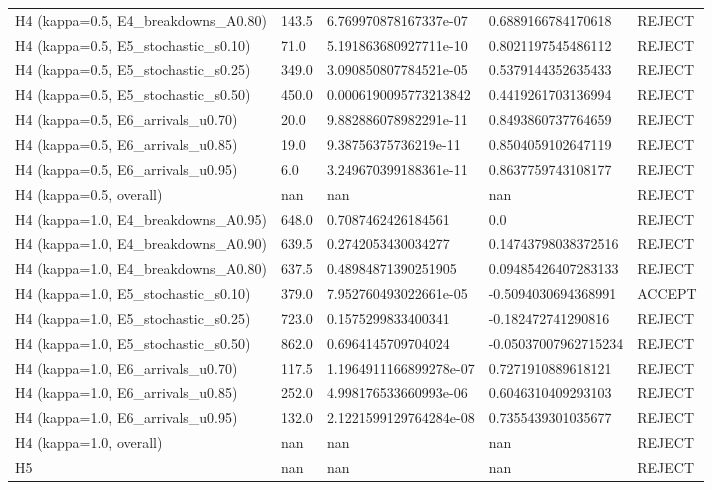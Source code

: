 \begin{table}[htbp]
\begin{tabular}{lllll}
H4 (kappa=0.5, E4\_breakdowns\_A0.80) & 143.5 & 6.769970878167337e-07 & 0.6889166784170618 & REJECT \\
H4 (kappa=0.5, E5\_stochastic\_s0.10) & 71.0 & 5.191863680927711e-10 & 0.8021197545486112 & REJECT \\
H4 (kappa=0.5, E5\_stochastic\_s0.25) & 349.0 & 3.090850807784521e-05 & 0.5379144352635433 & REJECT \\
H4 (kappa=0.5, E5\_stochastic\_s0.50) & 450.0 & 0.0006190095773213842 & 0.4419261703136994 & REJECT \\
H4 (kappa=0.5, E6\_arrivals\_u0.70) & 20.0 & 9.882886078982291e-11 & 0.8493860737764659 & REJECT \\
H4 (kappa=0.5, E6\_arrivals\_u0.85) & 19.0 & 9.38756375736219e-11 & 0.8504059102647119 & REJECT \\
H4 (kappa=0.5, E6\_arrivals\_u0.95) & 6.0 & 3.249670399188361e-11 & 0.8637759743108177 & REJECT \\
H4 (kappa=0.5, overall) & nan & nan & nan & REJECT \\
H4 (kappa=1.0, E4\_breakdowns\_A0.95) & 648.0 & 0.7087462426184561 & 0.0 & REJECT \\
H4 (kappa=1.0, E4\_breakdowns\_A0.90) & 639.5 & 0.2742053430034277 & 0.14743798038372516 & REJECT \\
H4 (kappa=1.0, E4\_breakdowns\_A0.80) & 637.5 & 0.48984871390251905 & 0.09485426407283133 & REJECT \\
H4 (kappa=1.0, E5\_stochastic\_s0.10) & 379.0 & 7.952760493022661e-05 & -0.5094030694368991 & ACCEPT \\
H4 (kappa=1.0, E5\_stochastic\_s0.25) & 723.0 & 0.1575299833400341 & -0.182472741290816 & REJECT \\
H4 (kappa=1.0, E5\_stochastic\_s0.50) & 862.0 & 0.6964145709704024 & -0.05037007962715234 & REJECT \\
H4 (kappa=1.0, E6\_arrivals\_u0.70) & 117.5 & 1.1964911166899278e-07 & 0.7271910889618121 & REJECT \\
H4 (kappa=1.0, E6\_arrivals\_u0.85) & 252.0 & 4.998176533660993e-06 & 0.6046310409293103 & REJECT \\
H4 (kappa=1.0, E6\_arrivals\_u0.95) & 132.0 & 2.1221599129764284e-08 & 0.7355439301035677 & REJECT \\
H4 (kappa=1.0, overall) & nan & nan & nan & REJECT \\
H5 & nan & nan & nan & REJECT \\
\bottomrule
\end{tabular}
\end{table}